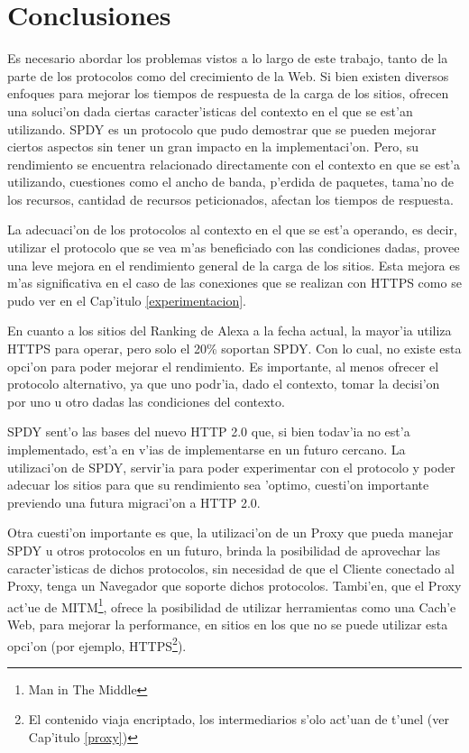 \chapter{Conclusiones}

Es necesario abordar los problemas vistos a lo largo de este trabajo, tanto de la parte de los protocolos como del crecimiento de la Web. Si bien existen diversos enfoques para mejorar los tiempos de respuesta de la carga de los sitios, ofrecen una soluci'on dada ciertas caracter'isticas del contexto en el que se est'an utilizando. SPDY es un protocolo que pudo demostrar que se pueden mejorar ciertos aspectos sin tener un gran impacto en la implementaci'on. Pero, su rendimiento se encuentra relacionado directamente con el contexto en que se est'a utilizando, cuestiones como el ancho de banda, p'erdida de paquetes, tama'no de los recursos, cantidad de recursos peticionados, afectan los tiempos de respuesta.

La adecuaci'on de los protocolos al contexto en el que se est'a operando, es decir, utilizar el protocolo que se vea m'as beneficiado con las condiciones dadas, provee una leve mejora en el rendimiento general de la carga de los sitios. Esta mejora es m'as significativa en el caso de las conexiones que se realizan con HTTPS como se pudo ver en el Cap'itulo \ref{experimentacion}.

En cuanto a los sitios del Ranking de Alexa a la fecha actual, la mayor'ia utiliza HTTPS para operar, pero solo el 20\% soportan SPDY. Con lo cual, no existe esta opci'on para poder mejorar el rendimiento. Es importante, al menos ofrecer el protocolo alternativo, ya que uno podr'ia, dado el contexto, tomar la decisi'on por uno u otro dadas las condiciones del contexto.

SPDY sent'o las bases del nuevo HTTP 2.0 que, si bien todav'ia no est'a implementado, est'a en v'ias de implementarse en un futuro cercano. La utilizaci'on de SPDY, servir'ia para poder experimentar con el protocolo y poder adecuar los sitios para que su rendimiento sea 'optimo, cuesti'on importante previendo una futura migraci'on a HTTP 2.0.

Otra cuesti'on importante es que, la utilizaci'on de un Proxy que pueda manejar SPDY u otros protocolos en un futuro, brinda la posibilidad de aprovechar las caracter'isticas de dichos protocolos, sin necesidad de que el Cliente conectado al Proxy, tenga un Navegador que soporte dichos protocolos. Tambi'en, que el Proxy act'ue de MITM\footnote{Man in The Middle}, ofrece la posibilidad de utilizar herramientas como una Cach'e Web, para mejorar la performance, en sitios en los que no se puede utilizar esta opci'on (por ejemplo, HTTPS\footnote{El contenido viaja encriptado, los intermediarios s'olo act'uan de t'unel (ver Cap'itulo \ref{proxy})}).